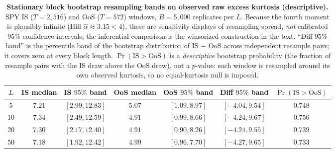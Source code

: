 \begin{table}[!ht]
\centering
\small
\caption{\textbf{Stationary block bootstrap resampling bands on observed raw excess kurtosis (descriptive).} SPY IS ($T = 2{,}516$) and OoS ($T = 572$) windows, $B = 5{,}000$ replicates per $L$. Because the fourth moment is plausibly infinite (Hill $\hat\alpha \approx 3.15 < 4$), these are sensitivity displays of resampling spread, \emph{not} calibrated $95\%$ confidence intervals; the inferential comparison is the winsorized construction in the text. ``Diff $95\%$ band'' is the percentile band of the bootstrap distribution of IS $-$ OoS across independent resample pairs; it covers zero at every block length. $\Pr(\text{IS} > \text{OoS})$ is a \emph{descriptive} bootstrap probability (the fraction of resample pairs with the IS draw above the OoS draw), not a $p$-value: each window is resampled around its own observed kurtosis, so no equal-kurtosis null is imposed.}
\label{tab:kurtosis_bootstrap}
\begin{tabular}{c c c c c c c}
\toprule
$L$ & IS median & IS $95\%$ band & OoS median & OoS $95\%$ band & Diff $95\%$ band & $\Pr(\text{IS} > \text{OoS})$ \\
\midrule
$5$  & $7.21$ & $[2.99, 12.83]$ & $5.07$ & $[1.09, 8.97]$ & $[-4.04, 9.54]$ & $0.748$ \\
$10$ & $7.34$ & $[2.49, 12.59]$ & $4.91$ & $[0.99, 8.66]$ & $[-4.24, 9.67]$ & $0.756$ \\
$20$ & $7.30$ & $[2.17, 12.40]$ & $4.91$ & $[0.90, 8.26]$ & $[-4.24, 9.55]$ & $0.739$ \\
$50$ & $7.18$ & $[1.92, 12.42]$ & $4.99$ & $[0.96, 7.70]$ & $[-4.27, 9.65]$ & $0.733$ \\
\bottomrule
\end{tabular}
\end{table}

